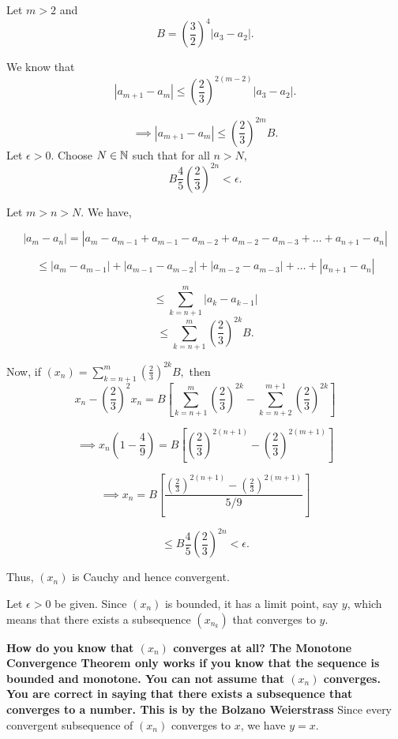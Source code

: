 \documentclass{report}
\begin{document}
\begin{myproof}

Let $m>2$ and $$B =\left(\frac{3}{2}\right)^{4}\left|a_3 -a_2\right|.$$

We know that  
$$ \left|a_{m+1} - a_m\right| \leq \left(\frac{2}{3}\right)^{2(m-2)} \left|a_3 -a_2\right|.$$

$$ \implies \left|a_{m+1} - a_m\right| \leq \left(\frac{2}{3}\right)^{2m}B.$$
Let $\epsilon > 0.$ Choose $N\in\NN$ such that for all $n > N$, $$ B \frac{4}{5}\left(\frac{2}{3}\right)^{2n}< \epsilon.$$

Let $m > n > N.$ We have,

$$|a_m - a_n|= |a_m - a_{m-1} + a_{m-1} - a_{m-2}  + a_{m-2} - a_{m-3}+ \dots+ a_{n+1} -  a_{n}| $$

$$\leq |a_m - a_{m-1}| + |a_{m-1} - a_{m-2}|  + 
|a_{m-2} -  a_{m-3}| + \dots + | a_{n+1} -  a_{n}| $$

$$ \leq \sum_{k={n+1}}^{m} |a_k - a_{k-1}|$$
$$ \leq \sum_{k={n+1}}^{m} \left(\frac{2}{3}\right)^{2k}B  .$$


Now, if $(x_n)= \sum_{k={n+1}}^{m} \left(\frac{2}{3}\right)^{2k}B , $ then
$$x_n - \left(\frac{2}{3}\right)^2x_n = B\left[\sum_{k={n+1}}^{m}\left(\frac{2}{3}\right)^{2k} - \sum_{k={n+2}}^{m+1}\left(\frac{2}{3}\right)^{2k}\right]$$

$$\implies x_n\left(1 - \frac{4}{9}\right) = B\left[ \left(\frac{2}{3}\right)^{2(n+1)}- \left(\frac{2}{3}\right)^{2(m+1)}\right] $$

$$\implies x_n = B\left[\frac{\left(\frac{2}{3}\right)^{2(n+1)}- \left(\frac{2}{3}\right)^{2(m+1)}}{5/9}\right] $$

$$\leq B \frac{4}{5}\left(\frac{2}{3}\right)^{2n} < \epsilon.$$


Thus, $(x_n)$ is Cauchy and hence convergent.

    
\end{myproof}

\pagebreak
{}

Let $\epsilon>0$ be given. Since $\left(x_n\right)$ is bounded, it has a limit point, say $y$, which means that there exists a subsequence $\left(x_{n_k}\right)$ that converges to $y$. 

\textbf{
How do you know that $(x_n)$ converges at all? The Monotone Convergence Theorem only works if you know that the sequence is bounded and monotone. You can not assume that $(x_n)$ converges. You are correct in saying that there exists a subsequence that converges to a number. This is by the Bolzano Weierstrass
}
Since every convergent subsequence of $\left(x_n\right)$ converges to $x$, we have $y=x$.
\end{document}
